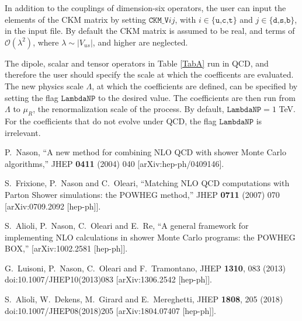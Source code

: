 \documentclass[paper]{JHEP3}
\begin{document}
In addition to the couplings of dimension-six operators, the user can input the elements of the CKM matrix by setting  $\texttt{CKM\_V}ij$, with $i \in \{\texttt{u,c,t}\}$ and $j \in \{ \texttt{d,s,b}\}$,
in the input file. By default the CKM matrix is assumed to be real, and terms of $\mathcal O(\lambda^2)$, where $\lambda \sim |V_{us}|$, and higher are neglected. 

The dipole, scalar and tensor operators in Table \ref{TabA} run in QCD, and therefore the user should specify the scale at which the coefficents are evaluated.
The new physics scale $\Lambda$, at which the coefficients are defined, can be specified 
by setting the flag $\texttt{LambdaNP}$ to the desired value. 
The coefficients are then run from $\Lambda$ to $\mu_R$, the renormalization scale of the  process. By default, $\texttt{LambdaNP} = 1$ TeV.
For the coefficients that do not evolve under QCD, the flag $\texttt{LambdaNP}$ is irrelevant.



\begin{thebibliography}{10}

  P.~Nason,
  ``A new method for combining NLO QCD with shower Monte Carlo algorithms,''
  JHEP {\bf 0411} (2004) 040
  [arXiv:hep-ph/0409146].

  S.~Frixione, P.~Nason and C.~Oleari,
``Matching NLO QCD computations with Parton Shower simulations: the POWHEG
method,''
  JHEP {\bf 0711} (2007) 070
  [arXiv:0709.2092 [hep-ph]].

  S.~Alioli, P.~Nason, C.~Oleari and E.~Re,
``A general framework for implementing NLO calculations in shower Monte Carlo
  programs: the POWHEG BOX,''
  [arXiv:1002.2581 [hep-ph]].

  G.~Luisoni, P.~Nason, C.~Oleari and F.~Tramontano,
  JHEP {\bf 1310}, 083 (2013)
  doi:10.1007/JHEP10(2013)083
  [arXiv:1306.2542 [hep-ph]].


  
  S.~Alioli, W.~Dekens, M.~Girard and E.~Mereghetti,
  JHEP {\bf 1808}, 205 (2018)
  doi:10.1007/JHEP08(2018)205
  [arXiv:1804.07407 [hep-ph]].
  

\end{thebibliography}
\end{document}
